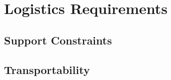 \KNEADSECTIONNEWPAGE
\section{Logistics Requirements}
\label{lab:sec_Logistics}



\KNEADSUBSECTIONNEWPAGE
\subsection{Support Constraints}
\label{lab:ssec_Logistics_SuportConstraints_CAP}




\KNEADSUBSECTIONNEWPAGE
\subsection{Transportability}
\label{lab:ssec_Logistics_Transportability}





